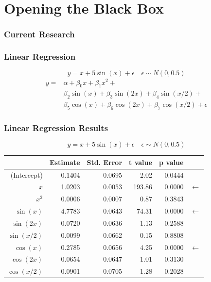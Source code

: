 \documentclass[aspectratio=169]{beamer}
\begin{document}
\section{Opening the Black Box}
\begin{frame}
	\frametitle{Current Research}

\end{frame}

\begin{frame}
	\frametitle{Linear Regression}
	\[ y = x + 5 \sin(x) + \epsilon \quad \epsilon \sim N(0, 0.5) \]
	\begin{align*}
		y = & \alpha + \beta_0 x + \beta_1 x^2 +                                \\
		    & \beta_2 \sin(x) + \beta_3 \sin(2x) + \beta_4 \sin(x/2) +          \\
		    & \beta_5 \cos(x) + \beta_6 \cos(2x) + \beta_7 \cos(x/2) + \epsilon
	\end{align*}
\end{frame}

\begin{frame}
	\frametitle{Linear Regression Results}
	\[ y = x + 5 \sin(x) + \epsilon \quad \epsilon \sim N(0, 0.5) \]
	\begin{table}
		\centering
		\begin{tabular}{rrrrrl}
			\hline
			              & Estimate & Std. Error & t value & p value &                \\
			\hline
			(Intercept)   & 0.1404   & 0.0695     & 2.02    & 0.0444  &                \\
			\(x\)         & 1.0203   & 0.0053     & 193.86  & 0.0000  & \(\leftarrow\) \\
			\(x^2\)       & 0.0006   & 0.0007     & 0.87    & 0.3843  &                \\
			\(\sin(x)\)   & 4.7783   & 0.0643     & 74.31   & 0.0000  & \(\leftarrow\) \\
			\(\sin(2x)\)  & 0.0720   & 0.0636     & 1.13    & 0.2588  &                \\
			\(\sin(x/2)\) & 0.0099   & 0.0662     & 0.15    & 0.8808  &                \\
			\(\cos(x)\)   & 0.2785   & 0.0656     & 4.25    & 0.0000  & \(\leftarrow\) \\
			\(\cos(2x)\)  & 0.0654   & 0.0647     & 1.01    & 0.3130  &                \\
			\(\cos(x/2)\) & 0.0901   & 0.0705     & 1.28    & 0.2028  &                \\
			\hline
		\end{tabular}
	\end{table}
\end{frame}
\end{document}

